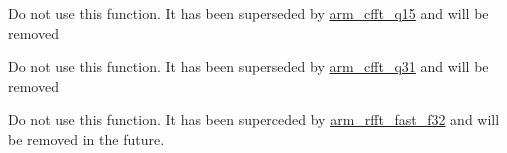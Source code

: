 \begin{DoxyRefList}
\item[\label{deprecated__deprecated000011}%
\hypertarget{deprecated__deprecated000011}{}%
Member \hyperlink{group__ComplexFFT_ga8d66cdac41b8bf6cefdb895456eee84a}{arm\+\_\+cfft\+\_\+radix4\+\_\+q15} (const arm\+\_\+cfft\+\_\+radix4\+\_\+instance\+\_\+q15 $\ast$S, q15\+\_\+t $\ast$p\+Src)]Do not use this function. It has been superseded by \hyperlink{group__ComplexFFT_ga68cdacd2267a2967955e40e6b7ec1229}{arm\+\_\+cfft\+\_\+q15} and will be removed  
\item[\label{deprecated__deprecated000012}%
\hypertarget{deprecated__deprecated000012}{}%
Member \hyperlink{group__ComplexFFT_gafde3ee1f58cf393b45a9073174fff548}{arm\+\_\+cfft\+\_\+radix4\+\_\+q31} (const arm\+\_\+cfft\+\_\+radix4\+\_\+instance\+\_\+q31 $\ast$S, q31\+\_\+t $\ast$p\+Src)]Do not use this function. It has been superseded by \hyperlink{group__ComplexFFT_ga5a0008bd997ab6e2e299ef2fb272fb4b}{arm\+\_\+cfft\+\_\+q31} and will be removed  
\item[\label{deprecated__deprecated000013}%
\hypertarget{deprecated__deprecated000013}{}%
Member \hyperlink{group__RealFFT_ga3df1766d230532bc068fc4ed69d0fcdc}{arm\+\_\+rfft\+\_\+f32} (const arm\+\_\+rfft\+\_\+instance\+\_\+f32 $\ast$S, float32\+\_\+t $\ast$p\+Src, float32\+\_\+t $\ast$p\+Dst)]Do not use this function. It has been superceded by \hyperlink{group__RealFFT_ga180d8b764d59cbb85d37a2d5f7cd9799}{arm\+\_\+rfft\+\_\+fast\+\_\+f32} and will be removed in the future. 
\end{DoxyRefList}